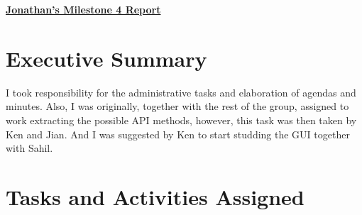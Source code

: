 \begin{center}
{\textbf{\underline{{Jonathan's Milestone 4 Report}}}}
\end{center}

\section*{Executive Summary}

I took responsibility for the administrative tasks and elaboration of agendas and minutes.  Also, I was originally, together with the rest of the group, assigned to work extracting the possible API methods, however, this task was then taken by Ken and Jian.  And I was suggested by Ken to start studding the GUI together with Sahil.

\section*{Tasks and Activities Assigned}

